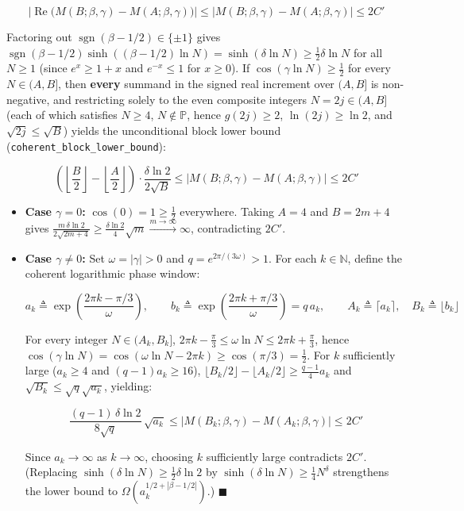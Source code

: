 \documentclass[
  11pt,
]{article}
\begin{document}
\[\left|\operatorname{Re}\big(M(B; \beta, \gamma) - M(A; \beta, \gamma)\big)\right| \le \big|M(B; \beta, \gamma) - M(A; \beta, \gamma)\big| \le 2C'\]

Factoring out \(\operatorname{sgn}(\beta - 1/2) \in \{\pm 1\}\) gives
\(\operatorname{sgn}(\beta - 1/2)\sinh((\beta - 1/2)\ln N) = \sinh(\delta \ln N) \ge \frac{1}{2}\delta \ln N\)
for all \(N \ge 1\) (since \(e^x \ge 1 + x\) and \(e^{-x} \le 1\) for
\(x \ge 0\)). If \(\cos(\gamma \ln N) \ge \frac{1}{2}\) for every
\(N \in (A, B]\), then \textbf{every} summand in the signed real
increment over \((A, B]\) is non-negative, and restricting solely to the
even composite integers \(N = 2j \in (A, B]\) (each of which satisfies
\(N \ge 4\), \(N \notin \mathbb{P}\), hence \(g(2j) \ge 2\),
\(\ln(2j) \ge \ln 2\), and \(\sqrt{2j} \le \sqrt{B}\)) yields the
unconditional block lower bound
(\texttt{coherent\_block\_lower\_bound}):

\[\left(\left\lfloor\frac{B}{2}\right\rfloor - \left\lfloor\frac{A}{2}\right\rfloor\right) \cdot \frac{\delta \ln 2}{2\sqrt{B}} \le \big|M(B; \beta, \gamma) - M(A; \beta, \gamma)\big| \le 2C'\]

\begin{itemize}
\item
  \textbf{Case \(\gamma = 0\):} \(\cos(0) = 1 \ge \frac{1}{2}\)
  everywhere. Taking \(A = 4\) and \(B = 2m + 4\) gives
  \(\frac{m\,\delta \ln 2}{2\sqrt{2m+4}} \ge \frac{\delta \ln 2}{4}\sqrt{m} \xrightarrow{m \to \infty} \infty\),
  contradicting \(2C'\).
\item
  \textbf{Case \(\gamma \neq 0\):} Set \(\omega = |\gamma| > 0\) and
  \(q = e^{2\pi/(3\omega)} > 1\). For each \(k \in \mathbb{N}\), define
  the coherent logarithmic phase window:

  \[a_k \triangleq \exp\!\left(\frac{2\pi k - \pi/3}{\omega}\right), \qquad b_k \triangleq \exp\!\left(\frac{2\pi k + \pi/3}{\omega}\right) = q\,a_k, \qquad A_k \triangleq \lceil a_k \rceil,\quad B_k \triangleq \lfloor b_k \rfloor\]

  For every integer \(N \in (A_k, B_k]\),
  \(2\pi k - \frac{\pi}{3} \le \omega \ln N \le 2\pi k + \frac{\pi}{3}\),
  hence
  \(\cos(\gamma \ln N) = \cos(\omega \ln N - 2\pi k) \ge \cos(\pi/3) = \frac{1}{2}\).
  For \(k\) sufficiently large (\(a_k \ge 4\) and \((q-1)a_k \ge 16\)),
  \(\lfloor B_k/2 \rfloor - \lfloor A_k/2 \rfloor \ge \frac{q-1}{4}a_k\)
  and \(\sqrt{B_k} \le \sqrt{q}\sqrt{a_k}\), yielding:

  \[\frac{(q - 1)\,\delta \ln 2}{8\sqrt{q}}\,\sqrt{a_k} \le \big|M(B_k; \beta, \gamma) - M(A_k; \beta, \gamma)\big| \le 2C'\]

  Since \(a_k \to \infty\) as \(k \to \infty\), choosing \(k\)
  sufficiently large contradicts \(2C'\). (Replacing
  \(\sinh(\delta\ln N) \ge \frac{1}{2}\delta\ln 2\) by
  \(\sinh(\delta\ln N) \ge \frac{1}{4}N^\delta\) strengthens the lower
  bound to \(\Omega(a_k^{1/2 + |\beta - 1/2|})\).) \(\blacksquare\)
\end{itemize}
\end{document}
